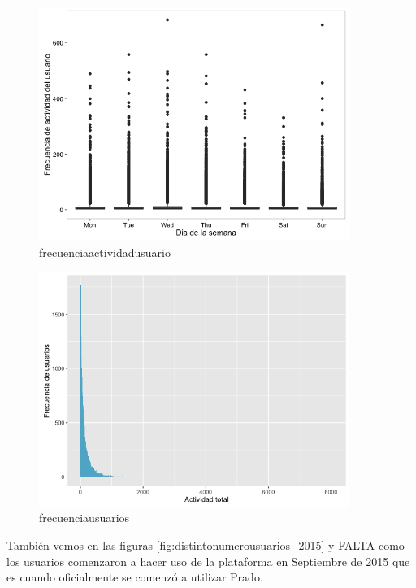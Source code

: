 \begin{figure}[H]
\centering
\includegraphics[width=0.9\textwidth]{../r/frecuenciaactividadusuario_2015}
\caption{frecuenciaactividadusuario}
\label{fig:frecuenciaactividadusuario_2015}
\end{figure}

\begin{figure}[H]
\centering
\includegraphics[width=0.9\textwidth]{../r/frecuenciausuarios_2015}
\caption{frecuenciausuarios}
\label{fig:frecuenciausuarios_2015}
\end{figure}

También vemos en las figuras \ref{fig:distintonumerousuarios_2015} y FALTA como los usuarios comenzaron a hacer uso de la plataforma en Septiembre de 2015 que es cuando oficialmente se comenzó a utilizar Prado.



